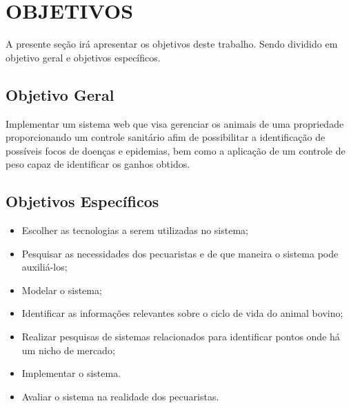 %
%



\section{OBJETIVOS}\label{chap:objetivos}

A presente seção irá apresentar os objetivos deste trabalho. Sendo dividido em objetivo geral e objetivos específicos.

\subsection{\textbf{Objetivo Geral}}

Implementar um sistema web que visa gerenciar os animais de uma propriedade proporcionando um controle sanitário afim de possibilitar a identificação de possíveis focos de doenças e epidemias, bem como a aplicação de um controle de peso capaz de identificar os ganhos obtidos.

\subsection{\textbf{Objetivos Específicos}}

\begin{itemize}
	\item Escolher as tecnologias a serem utilizadas no sistema;
	\item Pesquisar as necessidades dos pecuaristas e de que maneira o sistema pode auxiliá-los;
	\item Modelar o sistema;
	\item Identificar as informações relevantes sobre o ciclo de vida do animal bovino;
	\item Realizar pesquisas de sistemas relacionados para identificar pontos onde há um nicho de mercado;
	\item Implementar o sistema.
	\item Avaliar o sistema na realidade dos pecuaristas.
\end{itemize}
